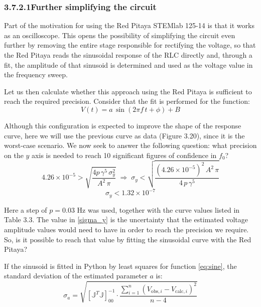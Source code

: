 \documentclass[12pt]{article}
\begin{document}
\subsubsection*{3.7.2.1\quad Further simplifying the circuit}

Part of the motivation for using the Red Pitaya STEMlab 125-14 is that it works as an oscilloscope. This opens the possibility of simplifying the circuit even further by removing the entire stage responsible for rectifying the voltage, so that the Red Pitaya reads the sinusoidal response of the RLC directly and, through a fit, the amplitude of that sinusoid is determined and used as the voltage value in the frequency sweep.

Let us then calculate whether this approach using the Red Pitaya is sufficient to reach the required precision. Consider that the fit is performed for the function:
\begin{equation} \label{eq:sine}
    V(t) = a\,\sin(2\pi f\,t + \phi) + B
\end{equation}

Although this configuration is expected to improve the shape of the response curve, here we will use the previous curve as data (Figure 3.20), since it is the worst-case scenario. We now seek to answer the following question: what precision on the $y$ axis is needed to reach 10 significant figures of confidence in $f_0$?
\begin{equation}
    4.26\times 10^{-5} > \sqrt{\frac{4p\,\gamma^5\,\sigma_y^2}{A^2\,\pi}}
    \;\Rightarrow\;
    \sigma_y < \sqrt{\frac{(4.26\times 10^{-5})^2\,A^2\,\pi}{4\,p\,\gamma^5}}
\end{equation}
\begin{equation} \label{sigma_y}
    \sigma_y < 1.32\times 10^{-7}
\end{equation}

Here a step of $p = 0.03$ Hz was used, together with the curve values listed in Table 3.3. The value in \eqref{sigma_y} is the uncertainty that the estimated voltage amplitude values would need to have in order to reach the precision we require. So, is it possible to reach that value by fitting the sinusoidal curve with the Red Pitaya?

If the sinusoid is fitted in Python by least squares for function \eqref{eq:sine}, the standard deviation of the estimated parameter $a$ is:
\begin{equation}
    \sigma_a = \sqrt{\left[\mathbb{J}^T \mathbb{J}\right]^{-1}_{00} \cdot \frac{\sum_{i=1}^{n}(V_{\text{obs},i} - V_{\text{calc},i})^2}{n-4}} \label{sineDeviation}
\end{equation}
\end{document}
